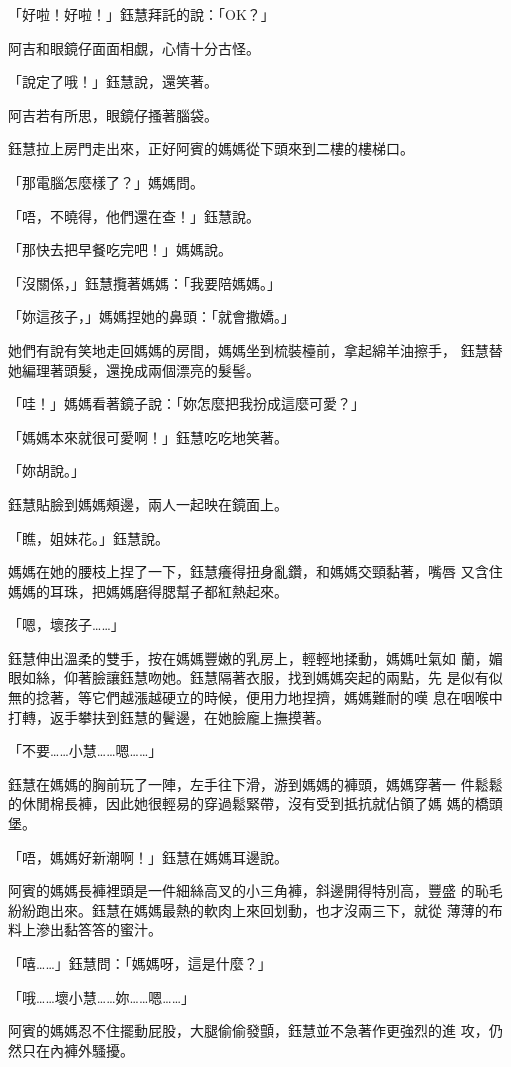 「好啦！好啦！」鈺慧拜託的說：「OK？」

阿吉和眼鏡仔面面相覷，心情十分古怪。

「說定了哦！」鈺慧說，還笑著。

阿吉若有所思，眼鏡仔搔著腦袋。

鈺慧拉上房門走出來，正好阿賓的媽媽從下頭來到二樓的樓梯口。

「那電腦怎麼樣了？」媽媽問。

「唔，不曉得，他們還在查！」鈺慧說。

「那快去把早餐吃完吧！」媽媽說。

「沒關係，」鈺慧攬著媽媽：「我要陪媽媽。」

「妳這孩子，」媽媽捏她的鼻頭：「就會撒嬌。」

她們有說有笑地走回媽媽的房間，媽媽坐到梳裝檯前，拿起綿羊油擦手，
鈺慧替她編理著頭髮，還挽成兩個漂亮的髮髻。

「哇！」媽媽看著鏡子說：「妳怎麼把我扮成這麼可愛？」

「媽媽本來就很可愛啊！」鈺慧吃吃地笑著。

「妳胡說。」

鈺慧貼臉到媽媽頰邊，兩人一起映在鏡面上。

「瞧，姐妹花。」鈺慧說。

媽媽在她的腰枝上捏了一下，鈺慧癢得扭身亂鑽，和媽媽交頸黏著，嘴唇
又含住媽媽的耳珠，把媽媽磨得腮幫子都紅熱起來。

「嗯，壞孩子……」

鈺慧伸出溫柔的雙手，按在媽媽豐嫩的乳房上，輕輕地揉動，媽媽吐氣如
蘭，媚眼如絲，仰著臉讓鈺慧吻她。鈺慧隔著衣服，找到媽媽突起的兩點，先
是似有似無的捻著，等它們越漲越硬立的時候，便用力地捏擠，媽媽難耐的嘆
息在咽喉中打轉，返手攀扶到鈺慧的鬢邊，在她臉龐上撫摸著。

「不要……小慧……嗯……」

鈺慧在媽媽的胸前玩了一陣，左手往下滑，游到媽媽的褲頭，媽媽穿著一
件鬆鬆的休閒棉長褲，因此她很輕易的穿過鬆緊帶，沒有受到抵抗就佔領了媽
媽的橋頭堡。

「唔，媽媽好新潮啊！」鈺慧在媽媽耳邊說。

阿賓的媽媽長褲裡頭是一件細絲高叉的小三角褲，斜邊開得特別高，豐盛
的恥毛紛紛跑出來。鈺慧在媽媽最熱的軟肉上來回划動，也才沒兩三下，就從
薄薄的布料上滲出黏答答的蜜汁。

「嘻……」鈺慧問：「媽媽呀，這是什麼？」

「哦……壞小慧……妳……嗯……」

阿賓的媽媽忍不住擺動屁股，大腿偷偷發顫，鈺慧並不急著作更強烈的進
攻，仍然只在內褲外騷擾。

